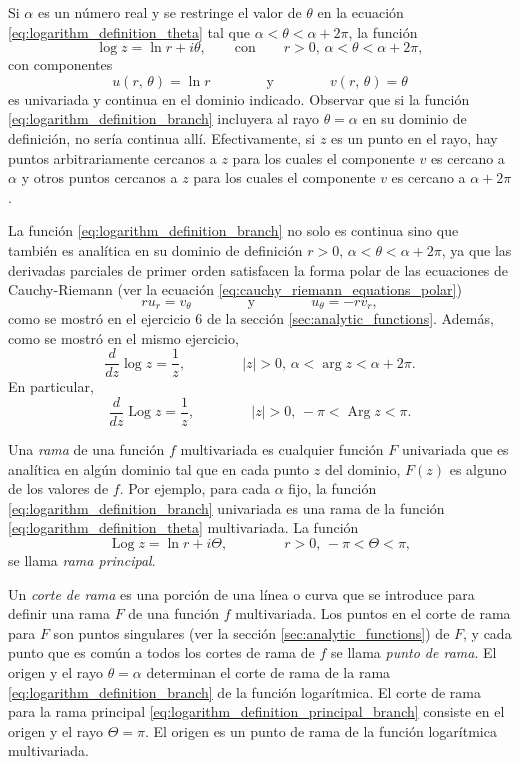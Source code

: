 \documentclass[a4paper]{report}
\DeclareMathOperator{\Arg}{Arg}
\DeclareMathOperator{\Log}{Log}
\begin{document}
Si \(\alpha\) es un número real y se restringe el valor de \(\theta\) en la ecuación \ref{eq:logarithm_definition_theta} tal que \(\alpha<\theta<\alpha+2\pi\), la función
\begin{equation}\label{eq:logarithm_definition_branch}
 \log z=\ln r+i\theta,
 \qquad\textrm{con}\qquad
 r>0,\,\alpha<\theta<\alpha+2\pi,
\end{equation}
con componentes
\[
 u(r,\,\theta)=\ln r
 \qquad\qquad\textrm{y}\qquad\qquad
 v(r,\,\theta)=\theta
\]
es univariada y continua en el dominio indicado. Observar que si la función \ref{eq:logarithm_definition_branch} incluyera al rayo \(\theta=\alpha\) en su dominio de definición, no sería continua allí. Efectivamente, si \(z\) es un punto en el rayo, hay puntos arbitrariamente cercanos a \(z\) para los cuales el componente \(v\) es cercano a \(\alpha\) y otros puntos cercanos a \(z\) para los cuales el componente \(v\) es cercano a \(\alpha+2\pi\). 

La función \ref{eq:logarithm_definition_branch} no solo es continua sino que también es analítica en su dominio de definición \(r>0,\,\alpha<\theta<\alpha+2\pi\), ya que las derivadas parciales de primer orden satisfacen la forma polar de las ecuaciones de Cauchy-Riemann (ver la ecuación \ref{eq:cauchy_riemann_equations_polar}) 
\[
 ru_r=v_\theta 
 \qquad\qquad\textrm{y}\qquad\qquad
 u_\theta=-rv_r,
\]
como se mostró en el ejercicio 6 de la sección \ref{sec:analytic_functions}. Además, como se mostró en el mismo ejercicio,
\[
 \frac{d}{dz}\log z=\frac{1}{z},
 \qquad\qquad
 |z|>0,\,\alpha<\arg z<\alpha+2\pi.
\]
En particular,
\[
 \frac{d}{dz}\Log z=\frac{1}{z},
 \qquad\qquad
 |z|>0,\,-\pi<\Arg z<\pi.
\]

Una \emph{rama} de una función \(f\) multivariada es cualquier función \(F\) univariada que es analítica en algún dominio tal que en cada punto \(z\) del dominio, \(F(z)\) es alguno de los valores de \(f\). Por ejemplo, para cada \(\alpha\) fijo, la función \ref{eq:logarithm_definition_branch} univariada es una rama de la función \ref{eq:logarithm_definition_theta} multivariada. La función 
\begin{equation}\label{eq:logarithm_definition_principal_branch}
 \Log z=\ln r+i\Theta,
 \qquad\qquad
 r>0,\,-\pi<\Theta<\pi, 
\end{equation}
se llama \emph{rama principal}.

Un \emph{corte de rama} es una porción de una línea o curva que se introduce para definir una rama \(F\) de una función \(f\) multivariada. Los puntos en el corte de rama para \(F\) son puntos singulares (ver la sección \ref{sec:analytic_functions}) de \(F\), y cada punto que es común a todos los cortes de rama de \(f\) se llama \emph{punto de rama}. El origen y el rayo \(\theta=\alpha\) determinan el corte de rama de la rama \ref{eq:logarithm_definition_branch} de la función logarítmica. El corte de rama para la rama principal \ref{eq:logarithm_definition_principal_branch} consiste en el origen y el rayo \(\Theta=\pi\). El origen es un punto de rama de la función logarítmica multivariada.
\end{document}
